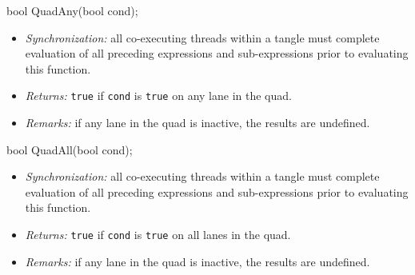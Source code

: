 \begin{HLSL}
bool QuadAny(bool cond);
\end{HLSL}

\begin{itemize}
  \item \textit{Synchronization:} all co-executing threads within a \gls{tangle}
  must complete evaluation of all preceding expressions and sub-expressions
  prior to evaluating this function.
  \item \textit{Returns:} \texttt{true} if \texttt{cond} is \texttt{true} on any
  \gls{lane} in the \gls{quad}.
  \item \textit{Remarks:} if any \gls{lane} in the \gls{quad} is inactive, the
  results are undefined.
\end{itemize}

\begin{HLSL}
bool QuadAll(bool cond);
\end{HLSL}

\begin{itemize}
  \item \textit{Synchronization:} all co-executing threads within a \gls{tangle}
  must complete evaluation of all preceding expressions and sub-expressions
  prior to evaluating this function.
  \item \textit{Returns:} \texttt{true} if \texttt{cond} is \texttt{true} on all
  \gls{lane}s in the \gls{quad}.
  \item \textit{Remarks:} if any \gls{lane} in the \gls{quad} is inactive, the
  results are undefined.
\end{itemize}

